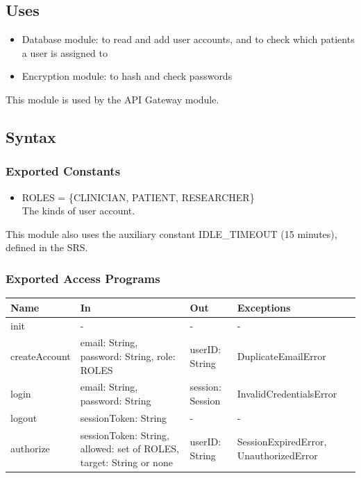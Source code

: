 \documentclass[12pt, titlepage]{article}
\begin{document}
\subsection{Uses}
\begin{itemize}
\item Database module: to read and add user accounts, and to check which
  patients a user is assigned to
\item Encryption module: to hash and check passwords
\end{itemize}
This module is used by the API Gateway module.

\subsection{Syntax}

\subsubsection{Exported Constants}
\begin{itemize}
\item ROLES = \{CLINICIAN, PATIENT, RESEARCHER\}\\
The kinds of user account.
\end{itemize}
This module also uses the auxiliary constant IDLE\_TIMEOUT (15 minutes),
defined in the SRS.

\subsubsection{Exported Access Programs}

\begin{center}
\begin{tabular}{p{3cm} p{4.5cm} p{3.5cm} p{4cm}}
\hline
\textbf{Name} & \textbf{In} & \textbf{Out} & \textbf{Exceptions} \\
\hline
init & - & - & - \\
createAccount & email: String, password: String, role: ROLES & userID: String
  & DuplicateEmailError \\
login & email: String, password: String & session: Session &
  InvalidCredentialsError \\
logout & sessionToken: String & - & - \\
authorize & sessionToken: String, allowed: set of ROLES, target: String or
  none & userID: String &
  SessionExpiredError, UnauthorizedError \\
\hline
\end{tabular}
\end{center}
\end{document}
